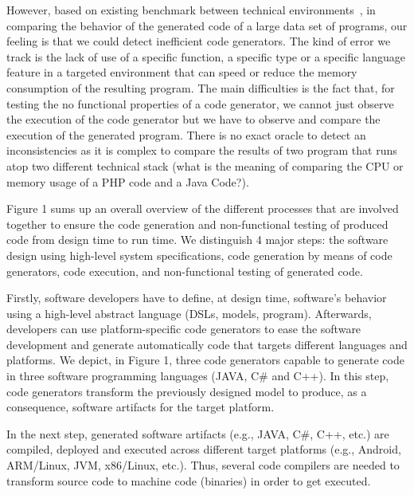 However, based on existing benchmark between technical environments~\cite{}, in comparing the behavior of the generated code of a large data set of programs, our feeling is that we could detect inefficient code generators. The kind of error we track is the lack of use of a specific function, a specific type or a specific language feature  in a targeted environment that can speed or reduce the memory consumption of the resulting program.  The main difficulties is the fact that, for testing the no functional properties of a code generator, we cannot just observe the execution of the code generator but we have to observe and compare the execution of the generated program. There is no exact oracle to detect an inconsistencies as it is complex to compare the results of two program that runs atop two different technical stack (what is the meaning of comparing the CPU or memory usage of a PHP code and a Java Code?). 

Figure 1 sums up an overall overview of the different processes that are involved together to ensure the code generation and non-functional testing of produced code from design time to run time. We distinguish 4 major steps: the software design using high-level system specifications, code generation by means of code generators, code execution, and non-functional testing of generated code. 

Firstly, software developers have to define, at design time, software's behavior using a high-level abstract language (DSLs, models, program). Afterwards, developers can use platform-specific code generators to ease the software development and generate automatically code that targets different languages and platforms. We depict, in Figure 1, three code generators capable to generate code in three software programming languages (JAVA, C\# and C++). In this step, code generators transform the previously designed model to produce, as a consequence, software artifacts for the target platform.

In the next step, generated software artifacts (e.g., JAVA, C\#, C++, etc.) are compiled, deployed and executed across different target platforms (e.g., Android, ARM/Linux, JVM, x86/Linux, etc.). Thus, several code compilers are needed to transform source code to machine code (binaries) in order to get executed. 

